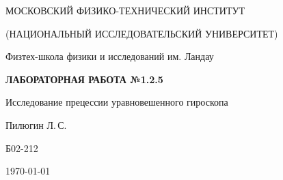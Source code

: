 
\begin{center}
    {
        \MakeUppercase{Московский физико-технический институт}

        \MakeUppercase{(Национальный исследовательский университет)}
    }

    {
        Физтех-школа физики и исследований им. Ландау
    }
    
    \vspace{200pt}
    {
        \Huge
        \bfseries
        \MakeUppercase{Лабораторная работа №1.2.5}
    }

    \vspace{24pt}
    {
        \Large
        Исследование прецессии уравновешенного гироскопа
    }

    \vspace{24pt}
    {
        \large
        Пилюгин Л.\,С.

        Б02-212
    }

    \vspace{2pt}
    {
        \large
        \today
    }
\end{center}

\newpage
{}
\setcounter{page}{2}
